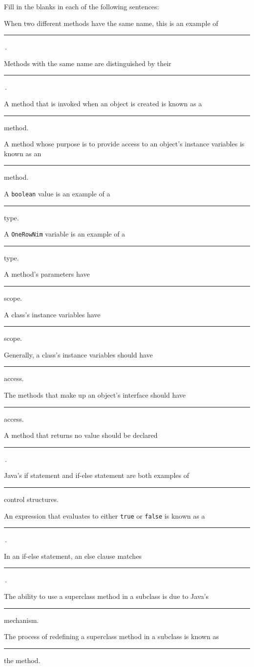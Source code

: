 \begin{EXRtwo}
\item  Fill in the blanks in each of the following sentences:

\begin{EXRtwoLL}
\baselineskip=14pt\item  When two different methods have the same name, this is
an example of \rule{30pt}{0.5pt}\,.
\item  Methods with the same name are distinguished by their
\rule{30pt}{0.5pt}\,.


\item  A method that is invoked when an object is created is
known as a \rule{30pt}{0.5pt} method.
\item  A method whose purpose is to provide access to an object's
instance variables is known as an \rule{30pt}{0.5pt} method.
\item  A {\tt boolean} value is an example of a \rule{30pt}{0.5pt} type.
\item  A {\tt OneRowNim} variable is an example of a \rule{30pt}{0.5pt} type.
\item  A method's parameters have \rule{30pt}{0.5pt} scope.
\item  A class's instance variables have \rule{30pt}{0.5pt} scope.
\item  Generally, a class's instance variables should have
\rule{30pt}{0.5pt} access.
\item  The methods that make up an object's interface should have
\rule{30pt}{0.5pt} access.
\item  A method that returns no value should be declared  \rule{30pt}{0.5pt}\,.
\item  Java's if statement and if-else statement are both examples of
\rule{30pt}{0.5pt}
control structures.
\item  An expression that evaluates to either {\tt true} or {\tt false} is
known as a  \rule{30pt}{0.5pt}\,.
\item  In an if-else statement, an else clause matches  \rule{30pt}{0.5pt}\,.
\item  The ability to use a superclass method in a subclass is due to Java's
  \rule{30pt}{0.5pt} mechanism.
\item  The process of redefining a superclass method in a subclass is
known as  \rule{30pt}{0.5pt} the method.
\end{EXRtwoLL}


\end{EXRtwo}

